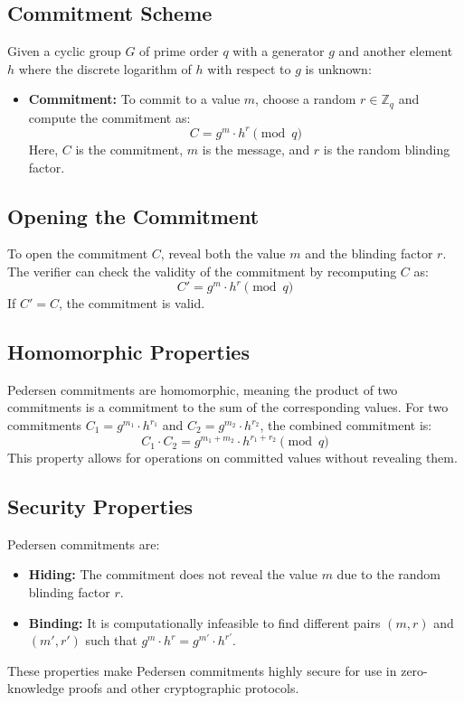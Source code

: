 \documentclass[12pt,a4paper]{report}
\begin{document}
\subsection{Commitment Scheme}
Given a cyclic group \( G \) of prime order \( q \) with a generator \( g \) and another element \( h \) where the discrete logarithm of \( h \) with respect to \( g \) is unknown:
\begin{itemize}
    \item \textbf{Commitment:} To commit to a value \( m \), choose a random \( r \in \mathbb{Z}_q \) and compute the commitment as:
    \[
    C = g^m \cdot h^r \pmod q
    \]
    Here, \( C \) is the commitment, \( m \) is the message, and \( r \) is the random blinding factor.
\end{itemize}

\subsection{Opening the Commitment}
To open the commitment \( C \), reveal both the value \( m \) and the blinding factor \( r \). The verifier can check the validity of the commitment by recomputing \( C \) as:
\[
C' = g^m \cdot h^r \pmod q
\]
If \( C' = C \), the commitment is valid.

\subsection{Homomorphic Properties}
Pedersen commitments are homomorphic, meaning the product of two commitments is a commitment to the sum of the corresponding values. For two commitments \( C_1 = g^{m_1} \cdot h^{r_1} \) and \( C_2 = g^{m_2} \cdot h^{r_2} \), the combined commitment is:
\[
C_1 \cdot C_2 = g^{m_1 + m_2} \cdot h^{r_1 + r_2} \pmod q
\]
This property allows for operations on committed values without revealing them.

\subsection{Security Properties}
Pedersen commitments are:
\begin{itemize}
    \item \textbf{Hiding:} The commitment does not reveal the value \( m \) due to the random blinding factor \( r \).
    \item \textbf{Binding:} It is computationally infeasible to find different pairs \( (m, r) \) and \( (m', r') \) such that \( g^m \cdot h^r = g^{m'} \cdot h^{r'} \).
\end{itemize}
These properties make Pedersen commitments highly secure for use in zero-knowledge proofs and other cryptographic protocols.
\end{document}
